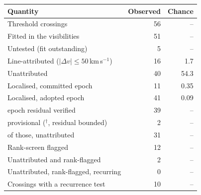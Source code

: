 \begin{tabular}{@{}lrr@{}}
\hline
Quantity & Observed & Chance \\
\hline
Threshold crossings & 56 & -- \\
Fitted in the visibilities & 51 & -- \\
Untested (fit outstanding) & 5 & -- \\
Line-attributed ($|\Delta v|\leq50$\,km\,s$^{-1}$) & 16 & 1.7 \\
Unattributed & 40 & 54.3 \\
Localised, committed epoch & 11 & 0.35 \\
Localised, adopted epoch & 41 & 0.09 \\
\quad epoch residual verified & 39 & -- \\
\quad provisional ($^{\dagger}$, residual bounded) & 2 & -- \\
\quad of those, unattributed & 31 & -- \\
Rank-screen flagged & 12 & -- \\
Unattributed and rank-flagged & 2 & -- \\
Unattributed, rank-flagged, recurring & 0 & -- \\
Crossings with a recurrence test & 10 & -- \\
\hline
\end{tabular}
